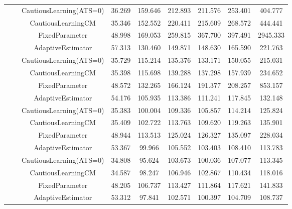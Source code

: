 \begin{table}[!h]
\begin{tabular}[t]{ccccccccc}
 &  & CautiousLearning(ATS=0) & 36.269 & 159.646 & 212.893 & 211.576 & 253.401 & 404.777\\

 &  & CautiousLearningCM & 35.346 & 152.552 & 220.411 & 215.609 & 268.572 & 444.441\\

 & \multirow[t]{-4}{*}{\centering\arraybackslash 0.35} & FixedParameter & 48.998 & 169.053 & 259.815 & 367.700 & 397.491 & 2945.333\\
\cmidrule{2-9}
 &  & AdaptiveEstimator & 57.313 & 130.460 & 149.871 & 148.630 & 165.590 & 221.763\\

 &  & CautiousLearning(ATS=0) & 35.729 & 115.214 & 135.376 & 133.171 & 150.055 & 215.031\\

 &  & CautiousLearningCM & 35.398 & 115.698 & 139.288 & 137.298 & 157.939 & 234.652\\

 & \multirow[t]{-4}{*}{\centering\arraybackslash 0.50} & FixedParameter & 48.572 & 132.265 & 166.124 & 191.377 & 208.257 & 853.157\\
\cmidrule{2-9}
 &  & AdaptiveEstimator & 54.176 & 105.935 & 113.386 & 111.241 & 117.845 & 132.148\\

 &  & CautiousLearning(ATS=0) & 35.383 & 100.004 & 109.336 & 105.857 & 114.214 & 125.824\\

 &  & CautiousLearningCM & 35.409 & 102.722 & 113.763 & 109.620 & 119.263 & 135.901\\

 & \multirow[t]{-4}{*}{\centering\arraybackslash 0.75} & FixedParameter & 48.944 & 113.513 & 125.024 & 126.327 & 135.097 & 228.034\\
\cmidrule{2-9}
 &  & AdaptiveEstimator & 53.367 & 99.966 & 105.552 & 103.403 & 108.410 & 113.783\\

 &  & CautiousLearning(ATS=0) & 34.808 & 95.624 & 103.673 & 100.036 & 107.077 & 113.345\\

 &  & CautiousLearningCM & 34.587 & 98.247 & 106.946 & 102.867 & 110.434 & 118.016\\

 & \multirow[t]{-4}{*}{\centering\arraybackslash 1.00} & FixedParameter & 48.205 & 106.737 & 113.427 & 111.864 & 117.621 & 141.833\\
\cmidrule{2-9}
 &  & AdaptiveEstimator & 53.312 & 97.841 & 102.571 & 100.397 & 104.709 & 108.737\\


\end{tabular}
\end{table}
